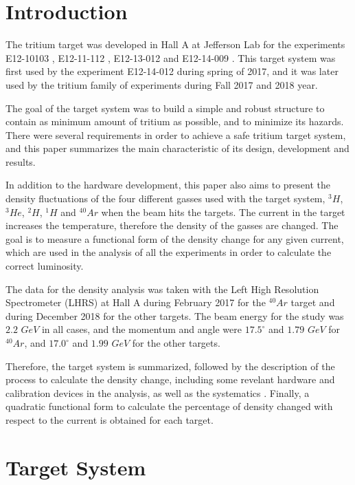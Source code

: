 \documentclass[final,5p,times,twocolumn]{elsarticle}
\begin{document}

\section{Introduction}
\label{}

The tritium target was developed in Hall A at Jefferson Lab for the experiments E12-10103 \cite{marathon}, E12-11-112 \cite{E12-11-112}, E12-13-012 \cite{E12-13-012} and E12-14-009 \cite{E12-14-009}. This target system was first used by the experiment E12-14-012 \cite{E12-14-012} during spring of 2017, and it was later used by the tritium family of experiments during  Fall 2017 and  2018 year. 

The goal of the target system was to build a simple and robust structure to contain as minimum amount of tritium as possible, and to minimize its hazards. There were several requirements in order to achieve a safe tritium target system, and this paper summarizes the main characteristic of its design, development and results. 

In addition to the hardware development, this paper also aims to present the density fluctuations of the four different gasses used with the target system, $^{3}H$, $^{3}He$, $^{2}H$, $^{1}H$ and $^{40}Ar$ when the beam hits the targets. The current in the target increases the temperature, therefore the density of the gasses are changed. The goal is to measure a functional form of the density change for any given current, which are used in the analysis of all the experiments in order to calculate the correct luminosity.

The data for the density analysis was taken with the Left High Resolution Spectrometer (LHRS) at Hall A during February 2017 for the $^{40}Ar$ target and during December 2018 for the other targets. The beam energy for the study was $2.2$ $GeV$ in all cases, and the momentum and angle were $17.5 ^\circ $ and $1.79$ $GeV$ for $^{40}Ar$, and $17.0 ^\circ $ and $1.99$ $GeV$ for the other targets.

Therefore, the target system is summarized, followed by the description of the process to calculate the density change, including some revelant hardware and calibration devices in the analysis, as well as the systematics . Finally, a quadratic functional form to calculate the percentage of density changed with respect to the current is  obtained for each target.



\section{Target System}
\end{document}
